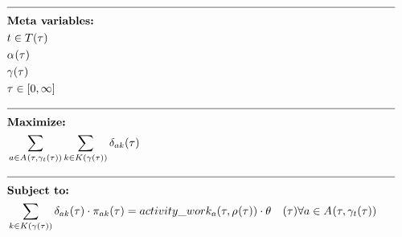\begin{alignat}{2}
	& \text{\rule{\linewidth}{0.4pt}} \notag\\
	& \textbf{Meta variables:}                                                                                                                                                                         \notag\\
	& \ElementTechnician \in \SetTechnician                                                                                                                                                            \\
	& \VarStrategicWorkOrderAssignment{}{}                                                                                                                                                             \\
	& \VarSupervisorAssignment{}{}                                                                                                                                                                     \\
	& \tau \in [0, \infty]                                                                                                                                                                             \\
	& \text{\rule{\linewidth}{0.4pt}} \notag\\
	& \textbf{Maximize:}                                                                                                                                                                               \notag\\
	& \sum_{\ElementActivity \in \SetActivity{\VarSupervisorAssignment{}{\ElementTechnician}}{}} \sum_{\ElementWorkSegment \in \SetWorkSegment} \VarProcessingTime                                           \\
	& \text{\rule{\linewidth}{0.4pt}} \notag\\
	& \textbf{Subject to:}                                                                                                                                                                             \notag\\
    & \sum_{\ElementWorkSegment \in \SetWorkSegment} \VarProcessingTime \cdot \VarActiveSegment{\ElementActivity}{\ElementWorkSegment} = \ParActivityWork{} \cdot \VarIncludeActivity                                                                                                                                            \quad \forall \ElementActivity \in \SetActivity{\VarSupervisorAssignment{}{\ElementTechnician}}{}                                                                                                      \\

\end{alignat}
